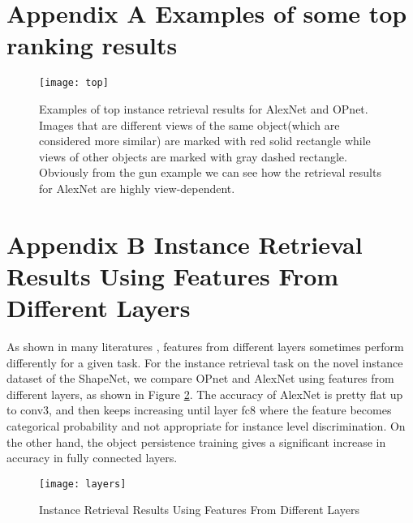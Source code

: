 \documentclass{article} %
\begin{document}
\newpage
\let\oldbibliography\thebibliography
\renewcommand{\thebibliography}[1]{\oldbibliography{#1}
\setlength{\itemsep}{5pt}} %



\newpage
\section*{Appendix A Examples of some top ranking results}


\begin{figure}[htbp]
\centering
\texttt{[image: top]}
\caption{Examples of top instance retrieval results for AlexNet and OPnet. Images that are different views of the same object(which are considered more similar) are marked with red solid rectangle while views of other objects are marked with gray dashed rectangle. Obviously from the gun example we can see how the retrieval results for AlexNet are highly view-dependent.}
\label{fig:top}
\end{figure}

\section*{Appendix B Instance Retrieval Results Using Features From Different Layers}
As shown in many literatures \citep{massa2015deep,DBLP:journals/corr/AubryR15}, features from different layers sometimes perform differently for a given task. For the instance retrieval task on the novel instance dataset of the ShapeNet, we compare OPnet and AlexNet using features from different layers, as shown in Figure \ref{fig:layers}. The accuracy of AlexNet is pretty flat up to conv3, and then keeps increasing until layer fc8 where the feature becomes categorical probability and not appropriate for instance level discrimination. On the other hand, the object persistence training gives a significant increase in accuracy in fully connected layers.

\begin{figure}[htbp]
\centering
\texttt{[image: layers]}
\caption{Instance Retrieval Results Using Features From Different Layers}
\label{fig:layers}
\end{figure}
\end{document}
